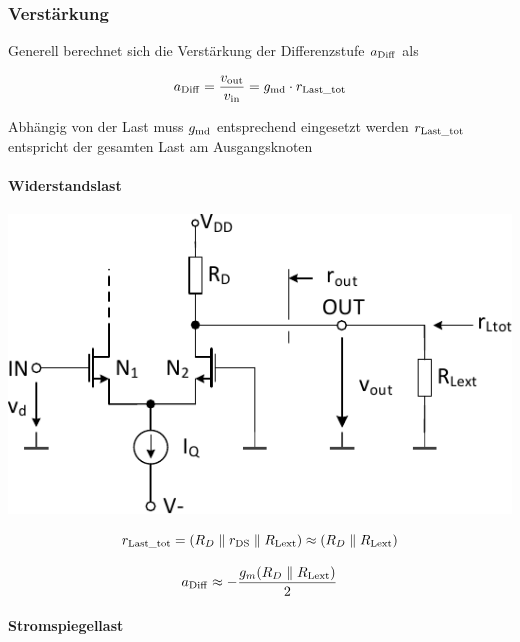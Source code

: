 \subsubsection{Verstärkung}

Generell berechnet sich die Verstärkung der Differenzstufe $a_{\rm Diff}$ als 

\[
    a_{\rm Diff} = \frac{v_{\rm out}}{v_{\rm in}} = g_{\rm md} \cdot r_{\rm Last\_tot}
\]

\begin{outline}
    \1 Abhängig von der Last muss $g_{\rm md}$ entsprechend eingesetzt werden
    \1 $r_{\rm Last\_tot}$ entspricht der gesamten Last am Ausgangsknoten
\end{outline}


\paragraph{Widerstandslast}

\begin{minipage}[t]{0.45\columnwidth}
    \includegraphics[width=\columnwidth, align=t]{images/09_differenzstufe_kleinsignal_verstaerkung_widerstand.pdf}
\end{minipage}
\hfill
\begin{minipage}[t]{0.5\columnwidth}
    \[
        r_{\rm Last\_tot} = \left( R_D \parallel r_{\rm DS} \parallel R_{\rm Lext} \right) \approx \left( R_D \parallel R_{\rm Lext} \right) 
    \]

    \[
        a_{\rm Diff} \approx - \frac{g_m (R_D \parallel R_{\rm Lext})}{2}
    \]
\end{minipage}



\paragraph{Stromspiegellast}

